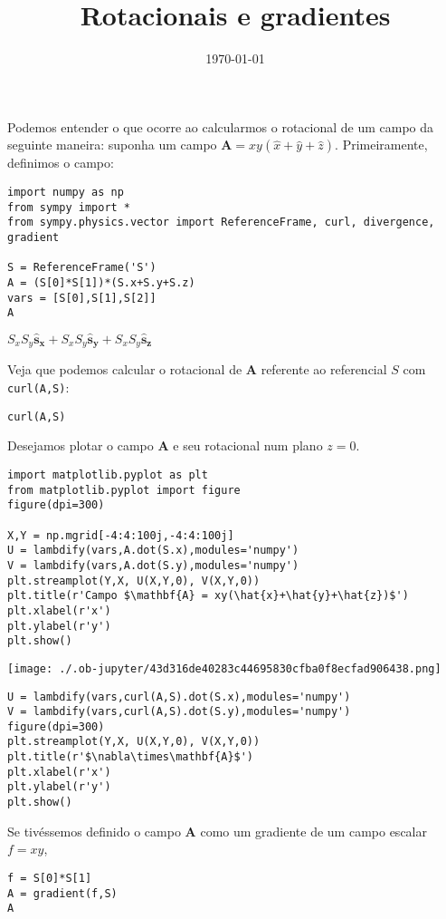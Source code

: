 \documentclass[11pt]{article}
\date{\today}
\title{Rotacionais e gradientes}
\begin{document}
\maketitle
Podemos entender o que ocorre ao calcularmos o rotacional de um campo da
seguinte maneira: suponha um campo \(\mathbf A = xy(\hat x+\hat y+\hat
z)\). Primeiramente, definimos o campo:

\begin{verbatim}
import numpy as np
from sympy import *
from sympy.physics.vector import ReferenceFrame, curl, divergence, gradient

S = ReferenceFrame('S')
A = (S[0]*S[1])*(S.x+S.y+S.z)
vars = [S[0],S[1],S[2]]
A
\end{verbatim}

$\displaystyle S_{x} S_{y}\mathbf{\hat{s}_x} + S_{x} S_{y}\mathbf{\hat{s}_y} + S_{x} S_{y}\mathbf{\hat{s}_z}$

Veja que podemos calcular o rotacional de \(\mathbf A\) referente ao
referencial \(S\) com \texttt{curl(A,S)}:
\begin{verbatim}
curl(A,S)
\end{verbatim}

Desejamos plotar o campo \(\mathbf A\) e seu rotacional num plano \(z=0\). 
\begin{verbatim}
import matplotlib.pyplot as plt
from matplotlib.pyplot import figure
figure(dpi=300)

X,Y = np.mgrid[-4:4:100j,-4:4:100j]
U = lambdify(vars,A.dot(S.x),modules='numpy')
V = lambdify(vars,A.dot(S.y),modules='numpy')
plt.streamplot(Y,X, U(X,Y,0), V(X,Y,0))
plt.title(r'Campo $\mathbf{A} = xy(\hat{x}+\hat{y}+\hat{z})$')
plt.xlabel(r'x')
plt.ylabel(r'y')
plt.show()
\end{verbatim}

\begin{center}
\texttt{[image: ./.ob-jupyter/43d316de40283c44695830cfba0f8ecfad906438.png]}
\end{center}
\begin{verbatim}
U = lambdify(vars,curl(A,S).dot(S.x),modules='numpy')
V = lambdify(vars,curl(A,S).dot(S.y),modules='numpy')
figure(dpi=300)
plt.streamplot(Y,X, U(X,Y,0), V(X,Y,0))
plt.title(r'$\nabla\times\mathbf{A}$')
plt.xlabel(r'x')
plt.ylabel(r'y')
plt.show()
\end{verbatim}

Se tivéssemos definido o campo \(\mathbf A\) como um gradiente de um campo
escalar \(f=xy\),
\begin{verbatim}
f = S[0]*S[1]
A = gradient(f,S)
A
\end{verbatim}
\end{document}
